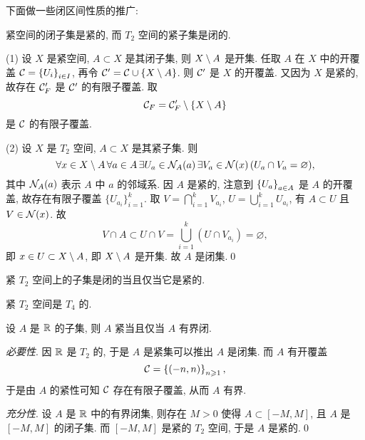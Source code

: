     下面做一些闭区间性质的推广:

    \begin{Proposition}
        紧空间的闭子集是紧的, 而 $ T_2 $ 空间的紧子集是闭的.
    \end{Proposition}
    \begin{Proof}
        (1) 设 $ X $ 是紧空间, $ A\subset X $ 是其闭子集, 则 $ X\setminus A $ 是开集. 任取 $ A $ 在 $ X $ 中的开覆盖 $ \mathcal{C}=\left\{ U_i \right\}_{i\in I} $, 再令 $ \mathcal{C}'=\mathcal{C}\cup\left\{ X\setminus A \right\} $. 则 $ \mathcal{C}' $ 是 $ X $ 的开覆盖. 又因为 $ X $ 是紧的, 故存在 $ \mathcal{C}_F' $ 是 $ \mathcal{C}' $ 的有限子覆盖. 取
        \[
            \mathcal{C}_F=\mathcal{C}'_F\setminus\left\{ X\setminus A \right\}
        \]
        是 $ \mathcal{C} $ 的有限子覆盖.

        (2) 设 $ X $ 是 $ T_2 $ 空间, $ A\subset X $ 是其紧子集. 则
        \[
            \forall x\in X\setminus A\,\forall a\in A\,\exists U_a\in\mathcal{N}_A(a)\,\exists V_a\in\mathcal{N}(x)\,(U_a\cap V_a=\varnothing),
        \]
        其中 $ \mathcal{N}_A(a) $ 表示 $ A $ 中 $ a $ 的邻域系. 因 $ A $ 是紧的, 注意到 $ \left\{ U_a \right\}_{a\in A} $ 是 $ A $ 的开覆盖, 故存在有限子覆盖 $ \{U_{a_i}\}_{i=1}^k $. 取 $ V=\bigcap_{i=1}^k V_{a_i} $, $ U=\bigcup_{i=1}^k U_{a_i} $, 有 $ A\subset U $ 且 $ V\in\mathcal{N}(x) $. 故
        \[
            V\cap A\subset U\cap V=\bigcup_{i=1}^k(U\cap V_{a_i})=\varnothing,
        \]
        即 $ x\in U\subset X\setminus A $, 即 $ X\setminus A $ 是开集. 故 $ A $ 是闭集.\qed
    \end{Proof}

    \begin{Corollary}
        紧 $ T_2 $ 空间上的子集是闭的当且仅当它是紧的.
    \end{Corollary}

    \begin{Proposition}
        紧 $ T_2 $ 空间是 $ T_4 $ 的.
    \end{Proposition}

    \begin{Proposition}
        设 $ A $ 是 $ \mathbb{R} $ 的子集, 则 $ A $ 紧当且仅当 $ A $ 有界闭.
    \end{Proposition}
    \begin{Proof}
        \textsl{必要性}. 因 $ \mathbb{R} $ 是 $ T_2 $ 的, 于是 $ A $ 是紧集可以推出 $ A $ 是闭集. 而 $ A $ 有开覆盖
        \[
            \mathcal{C}=\left\{ (-n,n) \right\}_{n\geqslant 1},
        \]
        于是由 $ A $ 的紧性可知 $ \mathcal{C} $ 存在有限子覆盖, 从而 $ A $ 有界.

        \textsl{充分性}. 设 $ A $ 是 $ \mathbb{R} $ 中的有界闭集, 则存在 $ M>0 $ 使得 $ A\subset[-M,M] $, 且 $ A $ 是 $ [-M,M] $ 的闭子集. 而 $ [-M,M] $ 是紧的 $ T_2 $ 空间, 于是 $ A $ 是紧的.\qed
    \end{Proof}

